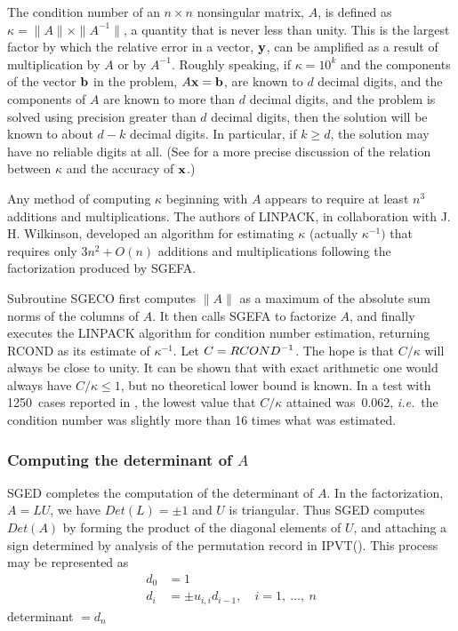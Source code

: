 \documentclass[twoside]{MATH77}
\begin{document}
The condition number of an $n\times n$ nonsingular matrix, $A$, is defined
as $\kappa = \|A\|\times \|A^{-1}\|$, a quantity that is never less than
unity.  This is the largest factor by which the relative error in a
vector, ${\bf y}$, can be amplified as a result of multiplication by $A$
or by $A^{-1}$.  Roughly speaking, if $\kappa = 10^k$ and the components
of the vector ${\bf b}$ in the problem, $A{\bf x} = {\bf b}$, are known to
$d$ decimal digits, and the components of $A$ are known to more than $d$
decimal digits, and the problem is solved using precision greater than $d$
decimal digits, then the solution will be known to about $d-k$ decimal
digits.  In particular, if $k \geq d$, the solution may have no reliable
digits at all.  (See \cite{Dongarra:1979:LUG} for a more precise
discussion of the relation between $\kappa $ and the accuracy of ${\bf
x}$.)

Any method of computing $\kappa $ beginning with $A$ appears to require at
least $n^3$ additions and multiplications. The authors of LINPACK, in
collaboration with J. H. Wilkinson, developed an algorithm for estimating $%
\kappa $ (actually $\kappa ^{-1})$ that requires only $3n^2 +
O(n)$ additions and multiplications following the factorization produced by
SGEFA.

Subroutine SGECO first computes $\|A\|$ as a maximum of the absolute sum
norms of the columns of $A$.  It then calls SGEFA to factorize $A$, and
finally executes the LINPACK algorithm for condition number estimation,
returning RCOND as its estimate of $\kappa ^{-1}$.  Let $C = RCOND^{%
-1}$.  The hope is that $C/\kappa $ will always be close to unity.  It can
be shown that with exact arithmetic one would always have $C/\kappa \leq
1$, but no theoretical lower bound is known.  In a test with 1250~cases
reported in \cite{Dongarra:1979:LUG}, the lowest value that $C/\kappa $
attained was~0.062, {\em i.e.}\ the condition number was slightly more
than 16 times what was estimated.

\subsubsection{Computing the determinant of $A$}

SGED completes the computation of the determinant of $A$. In the
factorization, $A = LU$, we have $Det(L) = \pm 1$ and $U$ is triangular.
Thus SGED computes $Det(A)$ by forming the product of the diagonal elements of
$U$, and attaching a sign determined by analysis of the permutation record
in IPVT(). This process may be represented as
\begin{align*}
d_0 &= 1\\
d_i &= \pm u_{i,i}d_{i-1},\quad i = 1,\ \ldots,\ n
\end{align*}
determinant $= d_n$
\end{document}
